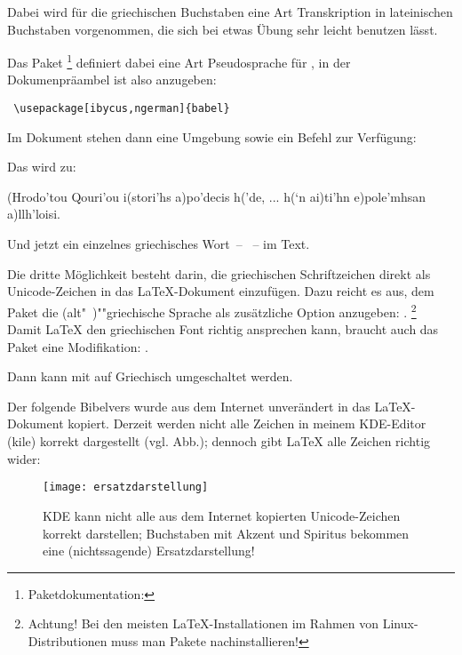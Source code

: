 Dabei wird für die griechischen Buchstaben eine Art Transkription in lateinischen Buchstaben
vorgenommen, die sich bei etwas Übung sehr leicht benutzen lässt.

Das Paket %
\footnote{Paketdokumentation: }
definiert dabei eine Art Pseudosprache für ,
in der Dokumenpräambel ist also anzugeben:

\begin{lstlisting}
 \usepackage[ibycus,ngerman]{babel}
\end{lstlisting}

Im Dokument stehen dann eine Umgebung  sowie ein Befehl 
zur Verfügung:


Das wird zu:

 \begin{ibycus}
  (Hrodo'tou Qouri’ou i(stori’hs a)po’decis h(’de,
  ...
  h(‘n ai)ti’hn e)pole’mhsan a)llh’loisi.
  \end{ibycus}

  Und jetzt ein einzelnes griechisches Wort~-- ~-- im Text.






Die dritte Möglichkeit besteht darin, die griechischen Schriftzeichen direkt als Unicode-Zeichen
in das \LaTeX -Dokument einzufügen. Dazu reicht es aus, dem Paket  die
(alt"~)""griechische Sprache als zusätzliche Option anzugeben:
.
\footnote{Achtung! Bei den meisten \LaTeX-Installationen im Rahmen von Linux-Distributionen muss
man Pakete nachinstallieren!}
Damit \LaTeX{} den griechischen Font richtig ansprechen kann, braucht auch das Paket 
eine Modifikation: .

Dann kann mit  auf Griechisch umgeschaltet werden.

Der folgende Bibelvers wurde aus dem Internet unverändert in das \LaTeX-Dokument
kopiert. Derzeit werden nicht alle Zeichen in meinem KDE-Editor (kile) korrekt dargestellt (vgl. Abb.);
dennoch gibt \LaTeX{} alle Zeichen richtig wider:

\begin{figure}
 \texttt{[image: ersatzdarstellung]}
 \caption{KDE kann nicht alle aus dem Internet kopierten Unicode-Zeichen korrekt darstellen;
 Buchstaben mit Akzent und Spiritus bekommen eine (nichtssagende) Ersatzdarstellung!}
\end{figure}


